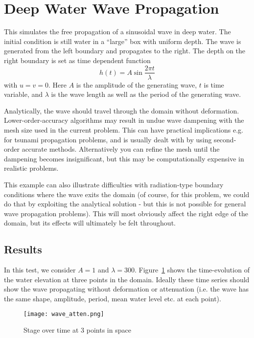 \section{Deep Water Wave Propagation}
This simulates the free propagation of a sinusoidal wave in deep water. The initial condition is still water in a ``large'' box with uniform depth. The wave is generated from the left boundary and propagates to the right. The depth on the right boundary is set as time dependent function
\begin{equation}
h(t) = A\sin{\frac{2\pi t}{\lambda}}
\end{equation}
with $u=v=0$. Here $A$ is the amplitude of the generating wave, $t$ is time variable, and $\lambda$ is the wave length as well as the period of the generating wave.

Analytically, the wave should travel through the domain without deformation. Lower-order-accuracy algorithms may result in undue wave dampening with the mesh size used in the current problem. This can have practical implications e.g. for tsunami propagation problems, and is usually dealt with by using second-order accurate methods. Alternatively you can refine the mesh until the dampening becomes insignificant, but this may be computationally expensive in realistic problems. 

This example can also illustrate difficulties with radiation-type boundary conditions where the wave exits the domain (of course, for this problem, we could do that by exploiting the analytical solution - but this is not possible for general wave propagation problems). This will most obviously affect the right edge of the domain, but its effects will ultimately be felt throughout. 


\subsection{Results}
In this test, we consider $A=1$ and $\lambda=300$.
Figure~\ref{fig:stagewave} shows the time-evolution of the water elevation at three points in the domain. Ideally these time series should show the wave propagating without deformation or attenuation (i.e. the wave has the same shape, amplitude, period, mean water level etc. at each point).  
\begin{figure}
\begin{center}
\texttt{[image: wave\_atten.png]}
\caption{Stage over time at 3 points in space}
\label{fig:stagewave}
\end{center}
\end{figure}



